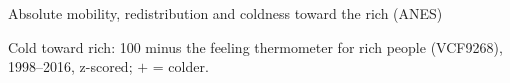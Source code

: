 \documentclass[aspectratio=169]{beamer}
\begin{document}

\begin{frame}{Absolute mobility, redistribution and coldness toward the rich (ANES)}

\begin{table}
    \centering
    \caption*{ANES: support for redistribution and coldness toward the rich on own-state absolute mobility}
    \vspace{-1.1em}
    {\tiny\setlength{\tabcolsep}{5pt}\renewcommand{\arraystretch}{0.82}
    }
\end{table}
\vspace{-0.6em}
{\tiny\centering Cold toward rich: 100 minus the feeling thermometer for rich people (VCF9268), 1998--2016, z-scored; $+$ = colder.\par}

\end{frame}



%
%
\end{document}
